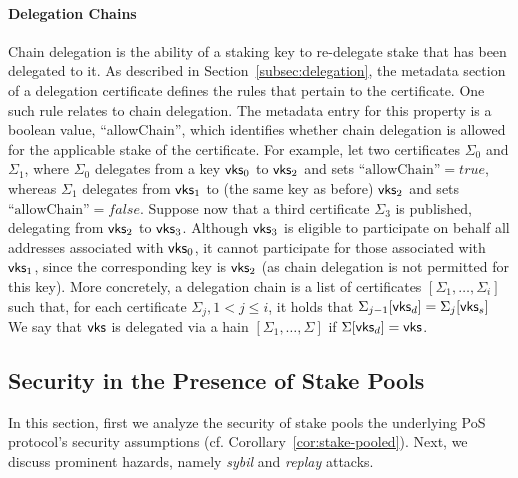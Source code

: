 \paragraph{Delegation Chains}\label{sec:chain_delegation}
Chain delegation is the ability of a staking key to re-delegate stake that has
been delegated to it. As described in Section~\ref{subsec:delegation}, the
metadata section of a delegation certificate defines the rules that pertain to
the certificate. One such rule relates to chain delegation. The metadata entry
for this property is a boolean value, ``allowChain'', which identifies whether
chain delegation is allowed for the applicable stake of the certificate.  For
example, let two certificates $\Sigma_0$ and  $\Sigma_1$, where $\Sigma_0$
delegates from a key $\mathsf{vks}_0$ to $\mathsf{vks}_2$ and sets
$\text{``allowChain''} = true$, whereas $\Sigma_1$ delegates from
$\mathsf{vks}_1$ to (the same key as before) $\mathsf{vks}_2$ and
sets $\text{``allowChain''} = false$. Suppose now that a third certificate
$\Sigma_3$ is published, delegating from $\mathsf{vks}_2$ to
$\mathsf{vks}_3$.  Although $\mathsf{vks}_3$ is eligible to
participate on behalf all addresses associated with $\mathsf{vks}_0$, it
cannot participate for those associated with $\mathsf{vks}_1$, since the
corresponding key is $\mathsf{vks}_2$ (as chain delegation is not
permitted for this key).  More concretely, a delegation chain is a list of
certificates $[\Sigma_1, \ldots, \Sigma_i]$ such that, for each certificate
$\Sigma_j, 1 < j \leq i$, it holds that $\Sigma_{j-1}[\mathsf{vks}_{d}] =
\Sigma_j[\mathsf{vks}_s]$  We say that $\mathsf{vks}$ is delegated
via a hain $[\Sigma_1, \ldots, \Sigma]$ if $\Sigma[\mathsf{vks}_{d}] =
\mathsf{vks}$.

\subsection{Security in the Presence of Stake Pools}\label{sec:stake-pooled-security}

In this section, first we analyze the security of stake pools \wrt the
underlying PoS protocol's security assumptions (cf.
Corollary~\ref{cor:stake-pooled}). Next, we discuss prominent hazards, namely
\emph{sybil} and \emph{replay} attacks.

